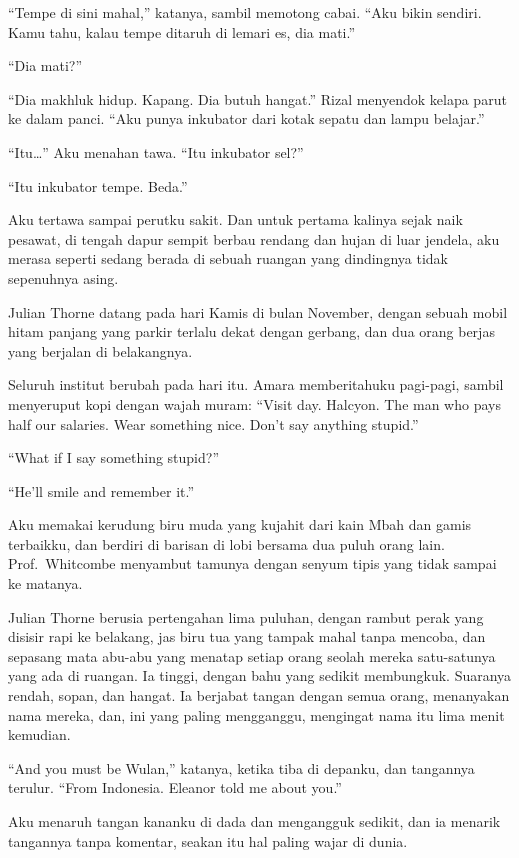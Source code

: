\documentclass[11pt,twoside,openany]{book}
\makeatletter
\newcommand{\scenebreak}{\par\vspace{0.9em}{\centering\textsc{*\hspace{0.7em}*\hspace{0.7em}*}\par}\vspace{0.9em}\@afterindentfalse\@afterheading}
\makeatother
\begin{document}
``Tempe di sini mahal,'' katanya, sambil memotong cabai. ``Aku bikin sendiri. Kamu tahu, kalau tempe ditaruh di lemari es, dia mati.''

``Dia mati?''

``Dia makhluk hidup. Kapang. Dia butuh hangat.'' Rizal menyendok kelapa parut ke dalam panci. ``Aku punya inkubator dari kotak sepatu dan lampu belajar.''

``Itu\ldots{}'' Aku menahan tawa. ``Itu inkubator sel?''

``Itu inkubator tempe. Beda.''

Aku tertawa sampai perutku sakit. Dan untuk pertama kalinya sejak naik pesawat, di tengah dapur sempit berbau rendang dan hujan di luar jendela, aku merasa seperti sedang berada di sebuah ruangan yang dindingnya tidak sepenuhnya asing.

\scenebreak
Julian Thorne datang pada hari Kamis di bulan November, dengan sebuah mobil hitam panjang yang parkir terlalu dekat dengan gerbang, dan dua orang berjas yang berjalan di belakangnya.

Seluruh institut berubah pada hari itu. Amara memberitahuku pagi-pagi, sambil menyeruput kopi dengan wajah muram: ``Visit day. Halcyon. The man who pays half our salaries. Wear something nice. Don't say anything stupid.''

``What if I say something stupid?''

``He'll smile and remember it.''

Aku memakai kerudung biru muda yang kujahit dari kain Mbah dan gamis terbaikku, dan berdiri di barisan di lobi bersama dua puluh orang lain. Prof.~Whitcombe menyambut tamunya dengan senyum tipis yang tidak sampai ke matanya.

Julian Thorne berusia pertengahan lima puluhan, dengan rambut perak yang disisir rapi ke belakang, jas biru tua yang tampak mahal tanpa mencoba, dan sepasang mata abu-abu yang menatap setiap orang seolah mereka satu-satunya yang ada di ruangan. Ia tinggi, dengan bahu yang sedikit membungkuk. Suaranya rendah, sopan, dan hangat. Ia berjabat tangan dengan semua orang, menanyakan nama mereka, dan, ini yang paling mengganggu, mengingat nama itu lima menit kemudian.

``And you must be Wulan,'' katanya, ketika tiba di depanku, dan tangannya terulur. ``From Indonesia. Eleanor told me about you.''

Aku menaruh tangan kananku di dada dan mengangguk sedikit, dan ia menarik tangannya tanpa komentar, seakan itu hal paling wajar di dunia.
\end{document}
